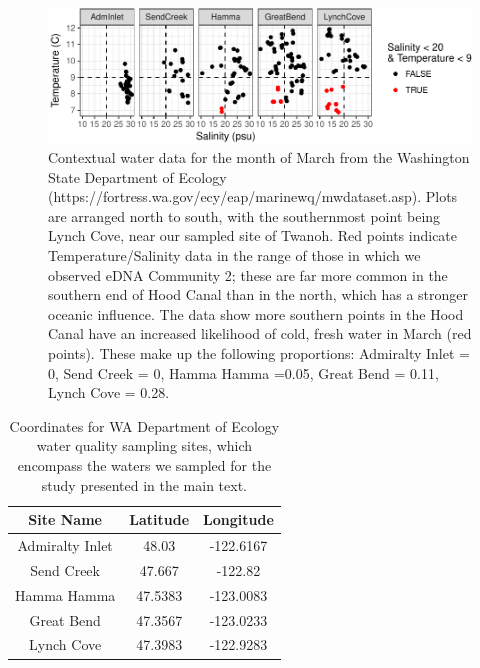 \documentclass[fleqn,10pt,lineno]{wlpeerj} %
\begin{document}
\begin{figure}[!ht]

{\centering \includegraphics{20171117_Tides_and_eDNA_RPK_files/figure-latex/ContextualWaterData_WAEcology-1} 

}

\caption{\label{fig:SupplementalWaterChem}Contextual water data for the month of March from the Washington State Department of Ecology (https://fortress.wa.gov/ecy/eap/marinewq/mwdataset.asp). Plots are arranged north to south, with the southernmost point being Lynch Cove, near our sampled site of Twanoh. Red points indicate Temperature/Salinity data in the range of those in which we observed eDNA Community 2; these are far more common in the southern end of Hood Canal than in the north, which has a stronger oceanic influence. The data show more southern points in the Hood Canal have an increased likelihood of cold, fresh water in March (red points). These make up the following proportions: Admiralty Inlet = 0, Send Creek = 0, Hamma Hamma =0.05, Great Bend = 0.11, Lynch Cove = 0.28.}\label{fig:ContextualWaterData_WAEcology}
\end{figure}

\begin{table}

\caption{\label{tab:SupplTable_EcologySampling}Coordinates for WA Department of Ecology water quality sampling sites, which encompass the waters we sampled for the study presented in the main text.}
\centering
\begin{tabular}[t]{c|c|c}
\hline
Site Name & Latitude & Longitude\\
\hline
Admiralty Inlet & 48.03 & -122.6167\\
\hline
Send Creek & 47.667 & -122.82\\
\hline
Hamma Hamma & 47.5383 & -123.0083\\
\hline
Great Bend & 47.3567 & -123.0233\\
\hline
Lynch Cove & 47.3983 & -122.9283\\
\hline
\end{tabular}
\end{table}
\end{document}
